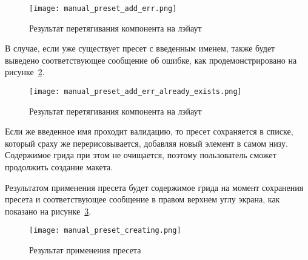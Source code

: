 \begin{figure}[ht]
  \centering
    \texttt{[image: manual\_preset\_add\_err.png]}
    \caption{Результат перетягивания компонента на лэйаут}
    \label{sec:manual:manual_preset_add_err}
\end{figure}

В случае, если уже существует пресет с введенным именем, также будет выведено соответствующее сообщение об ошибке, как продемонстрировано на рисунке~\ref{sec:manual:manual_preset_add_err_already_exists}.

\begin{figure}[ht]
  \centering
    \texttt{[image: manual\_preset\_add\_err\_already\_exists.png]}
    \caption{Результат перетягивания компонента на лэйаут}
    \label{sec:manual:manual_preset_add_err_already_exists}
\end{figure}

Если же введенное имя проходит валидацию, то пресет сохраняется в списке, который сраху же перерисовывается, добавляя новый элемент в самом низу. Содержимое грида при этом не очищается, поэтому пользователь сможет продолжить создание макета.

Результатом применения пресета будет содержимое грида на момент сохранения пресета и соответствующее сообщение в правом верхнем углу экрана, как показано на рисунке~\ref{sec:manual:manual_preset_creating}.

\begin{figure}[ht]
  \centering
    \texttt{[image: manual\_preset\_creating.png]}
    \caption{Результат применения пресета}
    \label{sec:manual:manual_preset_creating}
\end{figure}
